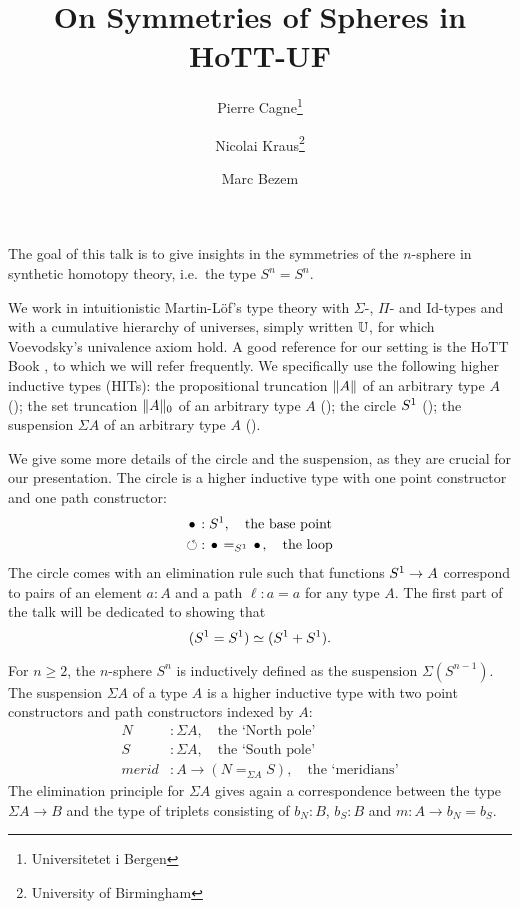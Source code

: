 \documentclass{easychair}
\title{On Symmetries of Spheres in HoTT-UF}%
\author{Pierre Cagne\thanks{Universitetet i Bergen} \and Nicolai
  Kraus\thanks{University of Birmingham} \and Marc
  Bezem\footnotemark[1]{}}%
\institute{
}
\newcommand{\mrd}{\mathit{merid}}%
\newcommand{\susp}[1]{\Sigma{#1}}%
\def\U{\universe U}%
\begin{document}
\maketitle

The goal of this talk is to give insights in the symmetries of the
$n$-sphere in synthetic homotopy theory, i.e.\ the type $S^n = S^n$.

We work in intuitionistic Martin-Löf's type theory with $\Sigma$-,
$\Pi$- and $\mathrm{Id}$-types and with a cumulative hierarchy of
universes, simply written $\U$, for which Voevodsky's univalence axiom
hold.  A good reference for our setting is the HoTT Book \cite{HoTT},
to which we will refer frequently. We specifically use the following
higher inductive types (HITs): the propositional truncation
$\lVert A\rVert$ of an arbitrary type $A$ (\cite[Ch.~3.7]{HoTT}); the set
truncation $\lVert A\rVert_0$ of an arbitrary type $A$
(\cite[Ch.~6.9]{HoTT}); the circle ${S^1}$ (\cite[Ch.~6.4]{HoTT}); the
suspension $\susp A$ of an arbitrary type $A$ (\cite[Ch.~6.5]{HoTT}).


We give some more details of the circle and the suspension, as they
are crucial for our presentation. The circle is a higher inductive
type with one point constructor and one path constructor:
\begin{align*}
  \base &: \Sc,  \quad\text{the base point}\\
  \Sloop &: \base =_{\Sc} \base,  \quad\text{the loop}
\end{align*}
The circle comes with an elimination rule such that functions
${S^1} \to A$ correspond to pairs of an element $a:A$ and a path
$\ell: a=a$ for any type $A$. The first part of the talk will be
dedicated to showing that
\begin{equation}
  \label{eq:s1-result}%
  (\Sc = \Sc) \weq (\Sc+\Sc).
\end{equation}

For $n\geq 2$, the $n$-sphere $S^n$ is inductively defined as the
suspension $\susp {(S^{n-1})}$. The suspension $\susp A$ of a type $A$
is a higher inductive type with two point constructors and path
constructors indexed by $A$:
\begin{align*}
  \label{eq:suspension}
  N &: \susp A, \quad\text{the `North pole'}\\
  S &: \susp A, \quad\text{the `South pole'}\\
  \mrd &: A \to (N =_{\susp A} S), \quad\text{the `meridians'}
\end{align*}
The elimination principle for $\susp A$ gives again a correspondence
between the type $\susp A \to B$ and the type of triplets consisting
of $b_N: B$, $b_S: B$ and $m: A \to b_N=b_S$.
\end{document}
